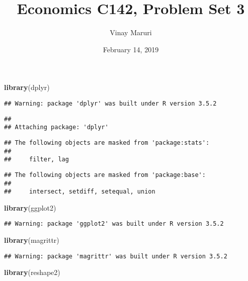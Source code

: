 \documentclass[]{article}
\title{Economics C142, Problem Set 3}
\author{Vinay Maruri}
\date{February 14, 2019}
\newenvironment{Shaded}{\begin{snugshade}}{\end{snugshade}}
\newcommand{\KeywordTok}[1]{\textcolor[rgb]{0.13,0.29,0.53}{\textbf{#1}}}
\newcommand{\NormalTok}[1]{#1}
\begin{document}
\maketitle

\begin{Shaded}
\begin{Highlighting}[]
\KeywordTok{library}\NormalTok{(dplyr)}
\end{Highlighting}
\end{Shaded}

\begin{verbatim}
## Warning: package 'dplyr' was built under R version 3.5.2
\end{verbatim}

\begin{verbatim}
## 
## Attaching package: 'dplyr'
\end{verbatim}

\begin{verbatim}
## The following objects are masked from 'package:stats':
## 
##     filter, lag
\end{verbatim}

\begin{verbatim}
## The following objects are masked from 'package:base':
## 
##     intersect, setdiff, setequal, union
\end{verbatim}

\begin{Shaded}
\begin{Highlighting}[]
\KeywordTok{library}\NormalTok{(ggplot2)}
\end{Highlighting}
\end{Shaded}

\begin{verbatim}
## Warning: package 'ggplot2' was built under R version 3.5.2
\end{verbatim}

\begin{Shaded}
\begin{Highlighting}[]
\KeywordTok{library}\NormalTok{(magrittr)}
\end{Highlighting}
\end{Shaded}

\begin{verbatim}
## Warning: package 'magrittr' was built under R version 3.5.2
\end{verbatim}

\begin{Shaded}
\begin{Highlighting}[]
\KeywordTok{library}\NormalTok{(reshape2)}
\end{Highlighting}
\end{Shaded}
\end{document}
